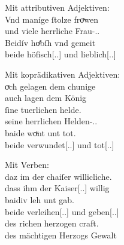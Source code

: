 \begin{exe}
\ex \begin{xlist}
	\ex \label{ex:konjattradj}
		Mit attributiven Adjektiven:\\
		\gll Vnd maníge ſtolze froͮwen \\
			und viele herrliche Frau-\Nom.\Pl.\FemF{} \\
	\sn \gll Beidív hoͤbſh vnd gemeit \\
			beide höfisch[\Nom.\Pl.\FemF] und lieblich[\Nom.\Pl.\FemF] \\
		\begin{taggedline}{\parencites[\pno~21va,21--22]{kc:VB}[zu][4351--4352]{schroeder1895}}
			\trans {}
		\end{taggedline}


	\ex \label{ex:konjcopredadj}
		Mit koprädikativen Adjektiven:\\
		\gll oͮch gelagen dem chunige \\
			auch lagen dem König \\
	\sn \gll ſine tuerlichen helde. \\
			seine herrlichen Helden-\Nom.\Pl.\MascM{} \\
	\sn \gll baide woͮnt unt tot. \\
			beide verwundet[\Nom.\Pl.\MascM] und tot[\Nom.\Pl.\MascM] \\
		\begin{taggedline}{\parencites[\pno~67vb,34--36]{kc:A1}[vgl.][15880--15883]{schroeder1895}}
			\trans {}
		\end{taggedline}

	\ex \label{ex:konjvb}
		Mit Verben:\\
		\gll daz im der chaiſer willicliche. \\
			dass ihm der Kaiser[\Nom.\Sg.\MascM] willig \\
	\sn	\gll baidiv leh unt gab. \\
			beide verleihen[\Tsg\subM.\Ind.\Pst] und
			geben[\Tsg\subM.\Ind.\Pst] \\
	\sn	\gll des richen herzogen craft. \\
			des mächtigen Herzogs Gewalt \\
		\begin{taggedline}{\parencites[\pno~73ra,19--21]{kc:A1}[vgl.][17108--17110]{schroeder1895}}
		\trans {}
		\end{taggedline}
	\end{xlist}
\end{exe}

